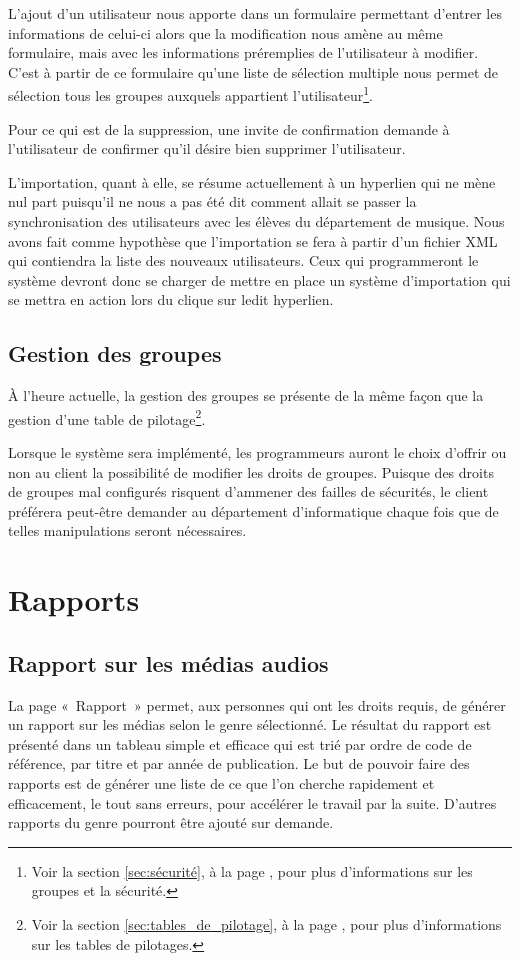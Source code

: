 \documentclass[letter, 11pt]{report}
\begin{document}
L'ajout d'un utilisateur nous apporte dans un formulaire permettant d'entrer les informations de celui-ci alors que la modification nous amène au même formulaire, mais avec les informations préremplies de l'utilisateur à modifier. C'est à partir de ce formulaire qu'une liste de sélection multiple nous permet de sélection tous les groupes auxquels appartient l'utilisateur\footnote{Voir la section \ref{sec:sécurité}, à la page \pageref{sec:sécurité}, pour plus d'informations sur les groupes et la sécurité.}.

Pour ce qui est de la suppression, une invite de confirmation demande à l'utilisateur de confirmer qu'il désire bien supprimer l'utilisateur.

L'importation, quant à elle, se résume actuellement à un hyperlien qui ne mène nul part puisqu'il ne nous a pas été dit comment allait se passer la synchronisation des utilisateurs avec les élèves du département de musique. Nous avons fait comme hypothèse que l'importation se fera à partir d'un fichier XML qui contiendra la liste des nouveaux utilisateurs. Ceux qui programmeront le système devront donc se charger de mettre en place un système d'importation qui se mettra en action lors du clique sur ledit hyperlien.

\subsection{Gestion des groupes}
À l'heure actuelle, la gestion des groupes se présente de la même façon que la gestion d'une table de pilotage\footnote{Voir la section \ref{sec:tables_de_pilotage}, à la page \pageref{sec:tables_de_pilotage}, pour plus d'informations sur les tables de pilotages.}.

Lorsque le système sera implémenté, les programmeurs auront le choix d'offrir ou non au client la possibilité de modifier les droits de groupes. Puisque des droits de groupes mal configurés risquent d'ammener des failles de sécurités, le client préférera peut-être demander au département d'informatique chaque fois que de telles manipulations seront nécessaires.

\section{Rapports}

\subsection{Rapport sur les médias audios}
La page «~Rapport~» permet, aux personnes qui ont les droits requis, de générer un rapport sur les médias selon le genre sélectionné. Le résultat du rapport est présenté dans un tableau simple et efficace qui est trié par ordre de code de référence, par titre et par année de publication. Le but de pouvoir faire des rapports est de générer une liste de ce que l'on cherche rapidement et efficacement, le tout sans erreurs, pour accélérer le travail par la suite. D'autres rapports du genre pourront être ajouté sur demande.
\end{document}

